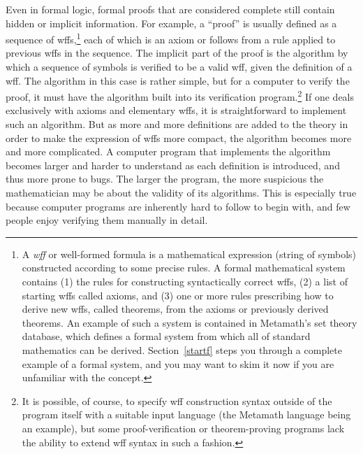Even in formal logic, formal proofs
that are considered complete still contain hidden or implicit information.
For example, a ``proof'' is usually defined as a sequence of
wffs,\footnote{A {\em wff} or well-formed
formula is a mathematical expression (string of symbols) constructed according
to some precise rules.  A formal mathematical system
contains (1) the rules for constructing syntactically correct
wffs, (2) a list of starting wffs called
axioms, and (3) one or more rules prescribing how to derive new
wffs, called theorems, from the axioms or previously derived
theorems.  An example of such a system is contained in
Metamath's set theory database, which defines a formal
system from which all of standard mathematics can be
derived.  Section~\ref{startf} steps you through a complete example of a formal
system, and you may want to skim it now if you are unfamiliar with the
concept.} each of which is an axiom or follows from a rule applied to previous
wffs in the sequence.  The implicit part of the proof is the algorithm by
which a sequence of symbols is verified to be a valid wff, given the
definition of a wff.  The algorithm in this case is rather simple, but for a
computer to verify the proof, it must have
the algorithm built into its verification program.\footnote{It is possible, of
course, to specify wff construction syntax outside of the program itself
with a suitable input language (the Metamath language being an example), but
some proof-verification or theorem-proving programs lack the ability to extend
wff syntax in such a fashion.} If one deals exclusively with axioms and
elementary wffs, it is straightforward to implement such an algorithm.  But as
more and more definitions are added to the theory in order to make the
expression of wffs more compact, the algorithm becomes more and more
complicated.  A computer program that implements the algorithm becomes larger
and harder to understand as each definition is introduced, and thus more prone
to bugs.  The larger the program, the
more suspicious the mathematician may be about
the validity of its algorithms.  This is especially true because
computer programs are inherently hard to follow to begin with, and few people
enjoy verifying them manually in detail.

